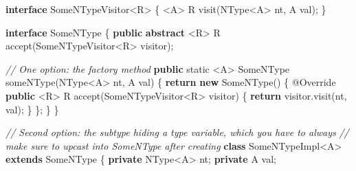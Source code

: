 \documentclass[]{article}
\newenvironment{Shaded}{}{}
\newcommand{\AttributeTok}[1]{\textcolor[rgb]{0.49,0.56,0.16}{#1}}
\newcommand{\CommentTok}[1]{\textcolor[rgb]{0.38,0.63,0.69}{\textit{#1}}}
\newcommand{\ControlFlowTok}[1]{\textcolor[rgb]{0.00,0.44,0.13}{\textbf{#1}}}
\newcommand{\DataTypeTok}[1]{\textcolor[rgb]{0.56,0.13,0.00}{#1}}
\newcommand{\FunctionTok}[1]{\textcolor[rgb]{0.02,0.16,0.49}{#1}}
\newcommand{\KeywordTok}[1]{\textcolor[rgb]{0.00,0.44,0.13}{\textbf{#1}}}
\newcommand{\NormalTok}[1]{#1}
\newcommand{\OperatorTok}[1]{\textcolor[rgb]{0.40,0.40,0.40}{#1}}
\begin{document}
\begin{Shaded}
\begin{Highlighting}[]
\KeywordTok{interface}\NormalTok{ SomeNTypeVisitor}\OperatorTok{\textless{}}\NormalTok{R}\OperatorTok{\textgreater{}} \OperatorTok{\{}
    \OperatorTok{\textless{}}\NormalTok{A}\OperatorTok{\textgreater{}}\NormalTok{ R }\FunctionTok{visit}\OperatorTok{(}\NormalTok{NType}\OperatorTok{\textless{}}\NormalTok{A}\OperatorTok{\textgreater{}}\NormalTok{ nt}\OperatorTok{,}\NormalTok{ A val}\OperatorTok{);}
\OperatorTok{\}}

\KeywordTok{interface}\NormalTok{ SomeNType }\OperatorTok{\{}
    \KeywordTok{public} \KeywordTok{abstract} \OperatorTok{\textless{}}\NormalTok{R}\OperatorTok{\textgreater{}}\NormalTok{ R }\FunctionTok{accept}\OperatorTok{(}\NormalTok{SomeNTypeVisitor}\OperatorTok{\textless{}}\NormalTok{R}\OperatorTok{\textgreater{}}\NormalTok{ visitor}\OperatorTok{);}

    \CommentTok{// One option: the factory method}
    \KeywordTok{public} \DataTypeTok{static} \OperatorTok{\textless{}}\NormalTok{A}\OperatorTok{\textgreater{}}\NormalTok{ SomeNType }\FunctionTok{someNType}\OperatorTok{(}\NormalTok{NType}\OperatorTok{\textless{}}\NormalTok{A}\OperatorTok{\textgreater{}}\NormalTok{ nt}\OperatorTok{,}\NormalTok{ A val}\OperatorTok{)} \OperatorTok{\{}
        \ControlFlowTok{return} \KeywordTok{new} \FunctionTok{SomeNType}\OperatorTok{()} \OperatorTok{\{}
            \AttributeTok{@Override}
            \KeywordTok{public} \OperatorTok{\textless{}}\NormalTok{R}\OperatorTok{\textgreater{}}\NormalTok{ R }\FunctionTok{accept}\OperatorTok{(}\NormalTok{SomeNTypeVisitor}\OperatorTok{\textless{}}\NormalTok{R}\OperatorTok{\textgreater{}}\NormalTok{ visitor}\OperatorTok{)} \OperatorTok{\{}
                \ControlFlowTok{return}\NormalTok{ visitor}\OperatorTok{.}\FunctionTok{visit}\OperatorTok{(}\NormalTok{nt}\OperatorTok{,}\NormalTok{ val}\OperatorTok{);}
            \OperatorTok{\}}
        \OperatorTok{\};}
    \OperatorTok{\}}
\OperatorTok{\}}

\CommentTok{// Second option: the subtype hiding a type variable, which you have to always}
\CommentTok{// make sure to upcast into \textasciigrave{}SomeNType\textasciigrave{} after creating}
\KeywordTok{class}\NormalTok{ SomeNTypeImpl}\OperatorTok{\textless{}}\NormalTok{A}\OperatorTok{\textgreater{}} \KeywordTok{extends}\NormalTok{ SomeNType }\OperatorTok{\{}
    \KeywordTok{private}\NormalTok{ NType}\OperatorTok{\textless{}}\NormalTok{A}\OperatorTok{\textgreater{}}\NormalTok{ nt}\OperatorTok{;}
    \KeywordTok{private}\NormalTok{ A val}\OperatorTok{;}


\end{Highlighting}
\end{Shaded}
\end{document}
